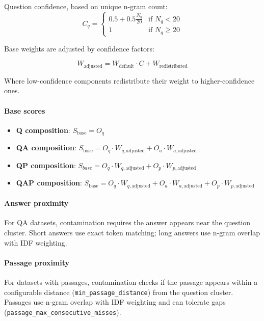 \documentclass[table]{ai2style/ai2}
\begin{document}
{{Question confidence, based on unique n-gram count:
\begin{equation*}
C_q = \begin{cases} 0.5 + 0.5 \frac{N_q}{20} & \text{if } N_q < 20 \\ 1 & \text{if } N_q \ge 20 \end{cases}
\end{equation*}

Base weights are adjusted by confidence factors:

\begin{equation*}
W_\text{adjusted} = W_\text{default} \cdot C + W_\text{redistributed}
\end{equation*}

Where low-confidence components redistribute their weight to higher-confidence ones.

\paragraph{Base scores}

\begin{itemize}
    \item {\bf{Q composition}}: $S_\text{base} = O_q$
    \item {\bf{QA composition}}: $S_\text{base} = O_q \cdot W_{q,\text{adjusted}} + O_a \cdot W_{a,\text{adjusted}}$
    \item {\bf{QP composition}}: $S_{base} = O_q \cdot W_{q,\text{adjusted}} + O_p \cdot W_{p,\text{adjusted}}$ 
    \item {\bf{QAP composition}}: $S_\text{base} = O_q \cdot W_{q,\text{adjusted}} + O_a \cdot W_{a,\text{adjusted}} + O_p \cdot W_{p,\text{adjusted}}$
\end{itemize}

\paragraph{Answer proximity}
For QA datasets, contamination requires the answer appears near the question cluster. Short answers use exact token matching; long answers use n-gram overlap with IDF weighting.

\paragraph{Passage proximity}
For datasets with passages, contamination checks if the passage appears within a configurable distance (\texttt{min\_passage\_distance}) from the question cluster. Passages use n-gram overlap with IDF weighting and can tolerate gaps (\texttt{passage\_max\_consecutive\_misses}).

}}
\end{document}
